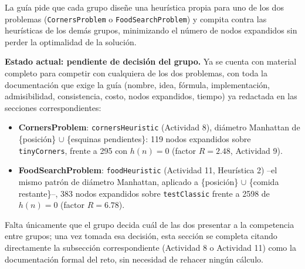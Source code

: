 La guía pide que cada grupo diseñe una heurística propia para uno de los dos problemas
(\texttt{CornersProblem} o \texttt{FoodSearchProblem}) y compita contra las heurísticas de los
demás grupos, minimizando el número de nodos expandidos sin perder la optimalidad de la solución.

\textbf{Estado actual: pendiente de decisión del grupo.} Ya se cuenta con material completo para
competir con cualquiera de los dos problemas, con toda la documentación que exige la guía
(nombre, idea, fórmula, implementación, admisibilidad, consistencia, costo, nodos expandidos,
tiempo) ya redactada en las secciones correspondientes:

\begin{itemize}
\item \textbf{CornersProblem}: \texttt{cornersHeuristic} (Actividad 8), diámetro Manhattan de
  \{posición\} $\cup$ \{esquinas pendientes\}: 119 nodos expandidos sobre \texttt{tinyCorners},
  frente a 295 con $h(n)=0$ (factor $R=2.48$, Actividad 9).
\item \textbf{FoodSearchProblem}: \texttt{foodHeuristic} (Actividad 11, Heurística 2) --el mismo
  patrón de diámetro Manhattan, aplicado a \{posición\} $\cup$ \{comida restante\}--, 383 nodos
  expandidos sobre \texttt{testClassic} frente a 2598 de $h(n)=0$ (factor $R=6.78$).
\end{itemize}

Falta únicamente que el grupo decida cuál de las dos presentar a la competencia entre grupos; una
vez tomada esa decisión, esta sección se completa citando directamente la subsección
correspondiente (Actividad 8 o Actividad 11) como la documentación formal del reto, sin necesidad
de rehacer ningún cálculo.
